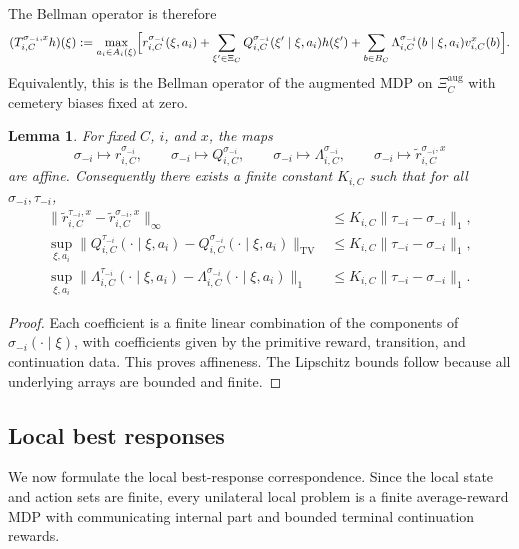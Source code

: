 \documentclass[12pt]{article}
\newtheorem{lemma}[theorem]{Lemma}
\theoremstyle{definition}
\newcommand{\1}{\mathbf{1}}
\begin{document}
The Bellman operator is therefore
\begin{equation}
\label{eq:Bellman-operator}
(T_{i,C}^{\sigma_{-i},x}h)(\xi)
:=
\max_{a_i\in A_i(\xi)}\Bigl[
 r_{i,C}^{\sigma_{-i}}(\xi,a_i)
 +\sum_{\xi'\in\Xi_C}Q_{i,C}^{\sigma_{-i}}(\xi'\mid\xi,a_i)h(\xi')
 +\sum_{b\in B_C}\Lambda_{i,C}^{\sigma_{-i}}(b\mid\xi,a_i)v_{i,C}^x(b)
 \Bigr].
\end{equation}
Equivalently, this is the Bellman operator of the augmented MDP on
$\Xi_C^{\mathrm{aug}}$ with cemetery biases fixed at zero.

\begin{lemma}
\label{lem:coeff-affine}
For fixed $C$, $i$, and $x$, the maps
\[
\sigma_{-i}\mapsto r_{i,C}^{\sigma_{-i}},
\qquad
\sigma_{-i}\mapsto Q_{i,C}^{\sigma_{-i}},
\qquad
\sigma_{-i}\mapsto \Lambda_{i,C}^{\sigma_{-i}},
\qquad
\sigma_{-i}\mapsto \widetilde r_{i,C}^{\sigma_{-i},x}
\]
are affine. Consequently there exists a finite constant $K_{i,C}$ such that for
all $\sigma_{-i},\tau_{-i}$,
\begin{align}
\|\widetilde r_{i,C}^{\tau_{-i},x}-\widetilde r_{i,C}^{\sigma_{-i},x}\|_\infty
&\le K_{i,C}\|\tau_{-i}-\sigma_{-i}\|_1,
\label{eq:r-lip}
\\
\sup_{\xi,a_i}\|Q_{i,C}^{\tau_{-i}}(\cdot\mid\xi,a_i)-Q_{i,C}^{\sigma_{-i}}(\cdot\mid\xi,a_i)\|_{\mathrm{TV}}
&\le K_{i,C}\|\tau_{-i}-\sigma_{-i}\|_1,
\label{eq:Q-lip}
\\
\sup_{\xi,a_i}\|\Lambda_{i,C}^{\tau_{-i}}(\cdot\mid\xi,a_i)-\Lambda_{i,C}^{\sigma_{-i}}(\cdot\mid\xi,a_i)\|_{1}
&\le K_{i,C}\|\tau_{-i}-\sigma_{-i}\|_1.
\label{eq:Lambda-lip}
\end{align}
\end{lemma}

\begin{proof}
Each coefficient is a finite linear combination of the components of
$\sigma_{-i}(\cdot\mid\xi)$, with coefficients given by the primitive reward,
transition, and continuation data. This proves affineness. The Lipschitz bounds
follow because all underlying arrays are bounded and finite.
\end{proof}

\subsection{Local best responses}

We now formulate the local best-response correspondence. Since the local state and
action sets are finite, every unilateral local problem is a finite average-reward
MDP with communicating internal part and bounded terminal continuation rewards.
\end{document}
